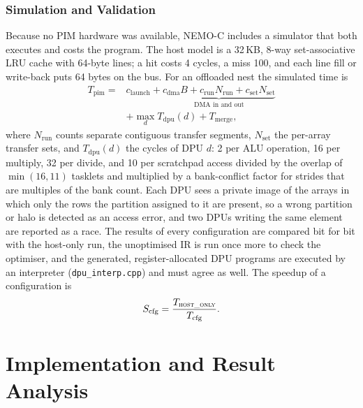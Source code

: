 \documentclass{ieeeaccess}
\begin{document}
\subsubsection{Simulation and Validation}
Because no PIM hardware was available, NEMO-C includes a simulator that both executes and costs the program. The host model is a 32\,KB, 8-way set-associative LRU cache with 64-byte lines; a hit costs 4 cycles, a miss 100, and each line fill or write-back puts 64 bytes on the bus. For an offloaded nest the simulated time is
\begin{equation}
\begin{aligned}
T_{\mathrm{pim}} ={}& c_{\mathrm{launch}} + \underbrace{c_{\mathrm{dma}}B + c_{\mathrm{run}}N_{\mathrm{run}} + c_{\mathrm{set}}N_{\mathrm{set}}}_{\text{DMA in and out}}\\
&+ \max_{d} T_{\mathrm{dpu}}(d) + T_{\mathrm{merge}},
\end{aligned}
\label{eq:pimtime}
\end{equation}
where $N_{\mathrm{run}}$ counts separate contiguous transfer segments, $N_{\mathrm{set}}$ the per-array transfer sets, and $T_{\mathrm{dpu}}(d)$ the cycles of DPU $d$: 2 per ALU operation, 16 per multiply, 32 per divide, and 10 per scratchpad access divided by the overlap of $\min(16,11)$ tasklets and multiplied by a bank-conflict factor for strides that are multiples of the bank count. Each DPU sees a private image of the arrays in which only the rows the partition assigned to it are present, so a wrong partition or halo is detected as an access error, and two DPUs writing the same element are reported as a race. The results of every configuration are compared bit for bit with the host-only run, the unoptimised IR is run once more to check the optimiser, and the generated, register-allocated DPU programs are executed by an interpreter (\texttt{dpu\_interp.cpp}) and must agree as well. The speedup of a configuration is
\begin{equation}
S_{\mathrm{cfg}} = \frac{T_{\textsc{host\_only}}}{T_{\mathrm{cfg}}}.
\label{eq:speedup}
\end{equation}

\section{Implementation and Result Analysis}
\label{sec:results}
\end{document}
